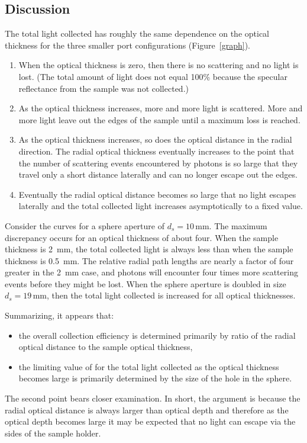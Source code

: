 \documentclass{article}
\begin{document}
\subsection*{Discussion}
The total light collected has roughly the same dependence on the optical
thickness for the three smaller port configurations (Figure~\ref{graph}).  
\begin{enumerate}
    \item 
    When the optical thickness is zero, then there is no scattering and no light is
    lost.  (The total amount of light does not equal 100\% because the specular
    reflectance from the sample was not collected.)

    \item
    As the optical thickness increases, more and more light is scattered.  More
    and more light leave out the edges of the sample until a maximum loss is
    reached.

    \item 
    As the optical thickness increases, so does the optical distance in
    the radial direction.  The radial optical thickness eventually increases 
    to the point that the number of scattering events encountered by photons 
    is so large that they travel only a short distance laterally and
    can no longer escape out the edges.

    \item 
    Eventually the radial optical distance becomes so large that no light escapes
    laterally and the total collected light increases asymptotically to
    a fixed value.  
\end{enumerate}

Consider the curves for a sphere aperture of $d_s=10\,$mm. The maximum discrepancy
occurs for an optical thickness of about four.  When the sample thickness is 2~mm, the total
collected light is always less than when the sample thickness is 0.5~mm.  The
relative radial path lengths are nearly a factor of four greater in the 2~mm 
case, and photons will encounter four times more scattering events before they
might be lost.  
When the sphere aperture is doubled in size $d_s=19\,$mm, then the total light
collected is increased for all optical thicknesses.  

Summarizing, it appears that: 
\begin{itemize}
\item
the overall collection efficiency is determined primarily by ratio of the
radial optical distance to the sample optical thickness,
\item
the limiting value of for the total light collected as the optical thickness
becomes large is primarily determined by the size of the hole in
the sphere.
\end{itemize}
The second point bears closer examination.  In short, the argument is
because the radial optical distance is always larger than
optical depth and therefore as the optical depth becomes large it may be expected
that no light can escape via the sides of the sample holder. 
\end{document}
